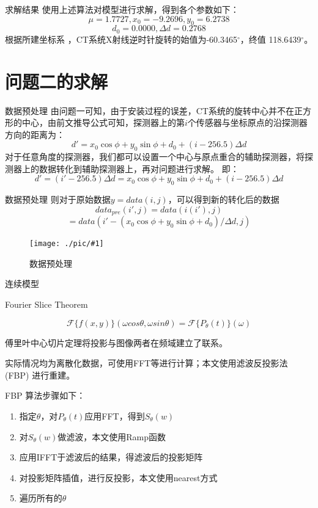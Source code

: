 \documentclass{beamer}
\newcommand{\midpic}[2]{  \begin{figure}[H]
\centering
\texttt{[image: ./pic/\#1]}\\
\caption{#2}
\end{figure}}
\begin{document}
\begin{frame}{求解结果} 
	使用上述算法对模型进行求解，得到各个参数如下：
	\[\mu = 1.7727,x_0 = -9.2696,y_0 = 6.2738\]
	\[d_0 = 0.0000,\Delta d = 0.2768\]
	根据所建坐标系 ，CT系统X射线逆时针旋转的始值为-60.3465$^\circ$，终值 118.6439$^\circ$。
\end{frame}

\section{问题二的求解}
\begin{frame}{数据预处理}
	由问题一可知，由于安装过程的误差，CT系统的旋转中心并不在正方形的中心，由前文推导公式可知，探测器上的第\(i\)个传感器与坐标原点的沿探测器方向的距离为：
	\[d' = x_0\cos\phi + y_0\sin\phi + d_0 +  (i - 256.5)\Delta d\]
	对于任意角度的探测器，我们都可以设置一个中心与原点重合的辅助探测器，将探测器上的数据转化到辅助探测器上，再对问题进行求解。
	即：
	\[d' = (i' - 256.5)\Delta d = x_0\cos\phi + y_0\sin\phi + d_0 +  (i - 256.5)\Delta d\]
\end{frame}

\begin{frame}{数据预处理}
	则对于原始数据\( y = data(i,j)\)，可以得到新的转化后的数据
	\[data_{pre}(i',j) = data(i(i'),j)\]
	\[ = data(i' - (x_0\cos\phi + y_0\sin\phi + d_0)/\Delta d,j)\]
	\midpic{datapre3.png}{数据预处理}
\end{frame}

\begin{frame}{连续模型}
	\begin{theorem}{Fourier Slice Theorem}
		  
		\begin{equation}
			\mathcal{F}\{f(x,y)\}(\omega cos\theta,\omega sin\theta)=\mathcal{F}\{P_\theta(t)\}(\omega)
		\end{equation}
	\end{theorem}
	  
	傅里叶中心切片定理将投影与图像两者在频域建立了联系。
	  
	实际情况均为离散化数据，可使用FFT等进行计算；本文使用滤波反投影法 (FBP) 进行重建。
	  
\end{frame}
  
  
  
\begin{frame}{FBP} 
	算法步骤如下：  
	\begin{enumerate}
		\item 指定$\theta$，对\(P_\theta (t)\)应用FFT，得到\(S_\theta (w)\)
		        
		\item 对\(S_\theta (w)\)做滤波，本文使用Ramp函数
		        
		\item 应用IFFT于滤波后的结果，得滤波后的投影矩阵
		        
		\item 对投影矩阵插值，进行反投影，本文使用nearest方式
		        
		\item 遍历所有的$\theta$    
	\end{enumerate}
\end{frame}
  
\end{document}
